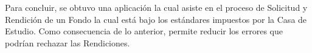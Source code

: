 \begin{resumen}
    
    

    
    Para concluir, se obtuvo una aplicación la cual asiste en el proceso de Solicitud y Rendición de un Fondo la cual está bajo los estándares impuestos por la Casa de Estudio. Como consecuencia de lo anterior, permite reducir los errores que podrían rechazar las Rendiciones.




\end{resumen}